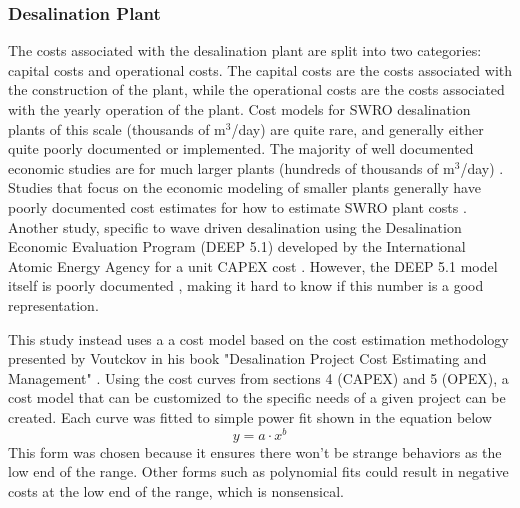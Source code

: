 \documentclass[twocolumn,10pt]{asme2e}
\begin{document}
\subsubsection{Desalination Plant}
The costs associated with the desalination plant are split into two categories: capital costs and operational costs. The capital costs are the costs associated with the construction of the plant, while the operational costs are the costs associated with the yearly operation of the plant. Cost models for SWRO desalination plants of this scale (thousands of m$^3$/day) are quite rare, and generally either quite poorly documented or implemented. The majority of well documented economic studies are for much larger plants (hundreds of thousands of m$^3$/day) \cite{Slocum2016,Haefner2023,roopexcurve,Wittholz2008}. Studies that focus on the economic modeling of smaller plants generally have poorly documented cost estimates for how to estimate SWRO plant costs \cite{Elkadeem2024,Goekcek2016}. Another study, specific to wave driven desalination using the Desalination Economic Evaluation Program (DEEP 5.1) developed by the International Atomic Energy Agency for a unit CAPEX cost \cite{Yu2022}. However, the DEEP 5.1 model itself is poorly documented \cite{DEEP5manual}, making it hard to know if this number is a good representation. 

This study instead uses a a cost model based on the cost estimation methodology presented by Voutckov in his book "Desalination Project Cost Estimating and Management" \cite{voutch}. Using the cost curves from sections 4 (CAPEX) and 5 (OPEX), a cost model that can be customized to the specific needs of a given project can be created. Each curve was fitted to simple power fit shown in the equation below
\begin{equation}
    y = a \cdot x^b
\end{equation}
This form was chosen because it ensures there won't be strange behaviors as the low end of the range. Other forms such as polynomial fits could result in negative costs at the low end of the range, which is nonsensical.



\end{document}
